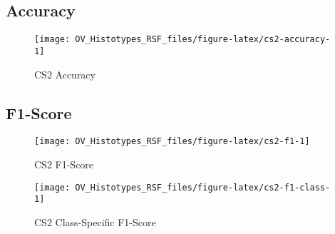 \documentclass[
]{report}
\begin{document}
\hypertarget{accuracy-1}{%
\subsection{Accuracy}\label{accuracy-1}}

\begin{figure}[H]

{\centering \texttt{[image: OV\_Histotypes\_RSF\_files/figure-latex/cs2-accuracy-1]} 

}

\caption{CS2 Accuracy}\label{fig:cs2-accuracy}
\end{figure}

\hypertarget{f1-score-1}{%
\subsection{F1-Score}\label{f1-score-1}}

\begin{figure}[H]

{\centering \texttt{[image: OV\_Histotypes\_RSF\_files/figure-latex/cs2-f1-1]} 

}

\caption{CS2 F1-Score}\label{fig:cs2-f1}
\end{figure}

\begin{figure}[H]

{\centering \texttt{[image: OV\_Histotypes\_RSF\_files/figure-latex/cs2-f1-class-1]} 

}

\caption{CS2 Class-Specific F1-Score}\label{fig:cs2-f1-class}
\end{figure}

  
\end{document}
